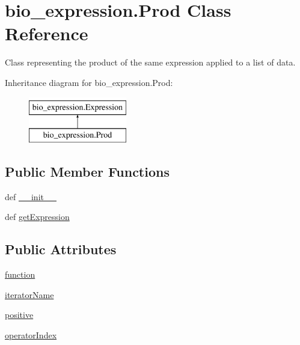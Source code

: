 \hypertarget{classbio__expression_1_1_prod}{\section{bio\+\_\+expression.\+Prod Class Reference}
\label{classbio__expression_1_1_prod}
}


Class representing the product of the same expression applied to a list of data.  


Inheritance diagram for bio\+\_\+expression.\+Prod\+:\begin{figure}[H]
\begin{center}
\leavevmode
\includegraphics[height=2.000000cm]{d0/d1d/classbio__expression_1_1_prod}
\end{center}
\end{figure}
\subsection*{Public Member Functions}
\begin{DoxyCompactItemize}
\item 
def \hyperlink{classbio__expression_1_1_prod_a7a9fca02306c4691b36695e696444a69}{\+\_\+\+\_\+init\+\_\+\+\_\+}
\item 
def \hyperlink{classbio__expression_1_1_prod_aa14b586932ec2e8fd8e4c863220d5168}{get\+Expression}
\end{DoxyCompactItemize}
\subsection*{Public Attributes}
\begin{DoxyCompactItemize}
\item 
\hyperlink{classbio__expression_1_1_prod_ad701a84ab99b64715360bd7cd3f23b72}{function}
\item 
\hyperlink{classbio__expression_1_1_prod_a44847763ff32dfe95d002b49e733bfc2}{iterator\+Name}
\item 
\hyperlink{classbio__expression_1_1_prod_a2b418ff03d043dd99bca62aef5b42962}{positive}
\item 
\hyperlink{classbio__expression_1_1_prod_abc58ca6ede4902b55b96afb0ecaf22c7}{operator\+Index}
\end{DoxyCompactItemize}


